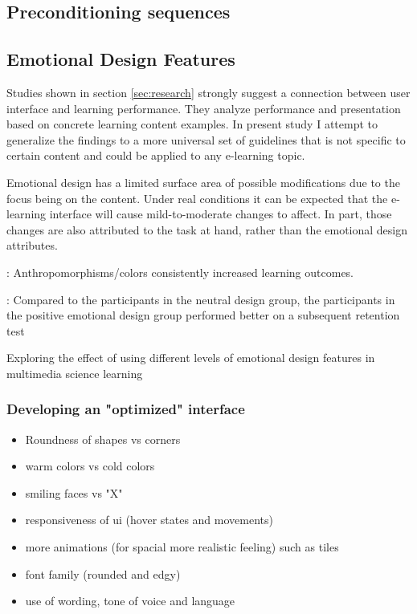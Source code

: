 	\subsection{Preconditioning sequences} \label{sec:preconditioning}
	
	
	
	\subsection{Emotional Design Features} \label{sec:emotional-design-features}

	Studies shown in section \ref{sec:research} strongly suggest a connection between user interface and learning performance. They analyze performance and presentation based on concrete learning content examples. In present study I attempt to generalize the findings to a more universal set of guidelines that is not specific to certain content and could be applied to any e-learning topic.
	
	Emotional design has a limited surface area of possible modifications due to the focus being on the content. Under real conditions it can be expected that the e-learning interface will cause mild-to-moderate changes to affect. In part, those changes are also attributed to the task at hand, rather than the emotional design attributes.
	
	\cite{Brom2018}: Anthropomorphisms/colors consistently increased learning outcomes.
	
	\cite{Le2018}: Compared to the participants in the neutral design group, the participants in the positive emotional design group performed better on a subsequent retention test
	
	\cite{Uzun2018} Exploring the effect of using different levels of emotional design features in multimedia science learning


	
	
	\subsubsection{Developing an "optimized" interface}
	
	
	\begin{itemize}
		\item Roundness of shapes vs corners
		\item warm colors vs cold colors
		\item smiling faces vs "X"
		\item responsiveness of ui (hover states and movements)
		\item more animations (for spacial more realistic feeling) such as tiles
		\item font family (rounded and edgy)
		\item use of wording, tone of voice and language \cite{Hancock2007}
	\end{itemize}

